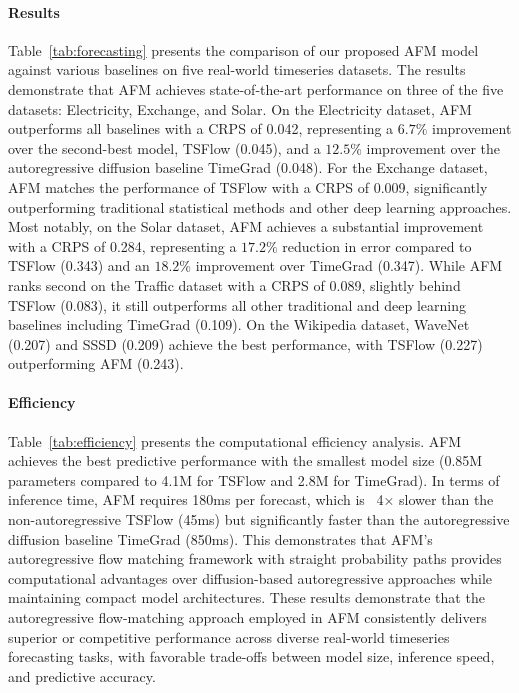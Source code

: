 \documentclass[a4paper,10pt,twocolumn,preprint,3p]{elsarticle}
\begin{document}
\paragraph{Results}
Table~\ref{tab:forecasting} presents the comparison of our proposed AFM model against various baselines on five real-world timeseries datasets. The results demonstrate that AFM achieves state-of-the-art performance on three of the five datasets: Electricity, Exchange, and Solar. On the Electricity dataset, AFM outperforms all baselines with a CRPS of 0.042, representing a $6.7\%$ improvement over the second-best model, TSFlow (0.045), and a $12.5\%$ improvement over the autoregressive diffusion baseline TimeGrad (0.048). For the Exchange dataset, AFM matches the performance of TSFlow with a CRPS of 0.009, significantly outperforming traditional statistical methods and other deep learning approaches. Most notably, on the Solar dataset, AFM achieves a substantial improvement with a CRPS of 0.284, representing a $17.2\%$ reduction in error compared to TSFlow (0.343) and an $18.2\%$ improvement over TimeGrad (0.347). While AFM ranks second on the Traffic dataset with a CRPS of 0.089, slightly behind TSFlow (0.083), it still outperforms all other traditional and deep learning baselines including TimeGrad (0.109). On the Wikipedia dataset, WaveNet (0.207) and SSSD (0.209) achieve the best performance, with TSFlow (0.227) outperforming AFM (0.243).

\paragraph{Efficiency}
Table~\ref{tab:efficiency} presents the computational efficiency analysis. AFM achieves the best predictive performance with the smallest model size (0.85M parameters compared to 4.1M for TSFlow and 2.8M for TimeGrad). In terms of inference time, AFM requires 180ms per forecast, which is ~4× slower than the non-autoregressive TSFlow (45ms) but significantly faster than the autoregressive diffusion baseline TimeGrad (850ms). This demonstrates that AFM's autoregressive flow matching framework with straight probability paths provides computational advantages over diffusion-based autoregressive approaches while maintaining compact model architectures. These results demonstrate that the autoregressive flow-matching approach employed in AFM consistently delivers superior or competitive performance across diverse real-world timeseries forecasting tasks, with favorable trade-offs between model size, inference speed, and predictive accuracy.
\end{document}

